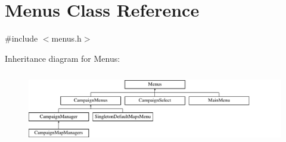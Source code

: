\hypertarget{class_menus}{}\section{Menus Class Reference}
\label{class_menus}


{\ttfamily \#include $<$menus.\+h$>$}

Inheritance diagram for Menus\+:\begin{figure}[H]
\begin{center}
\leavevmode
\includegraphics[height=3.200000cm]{class_menus}
\end{center}
\end{figure}
